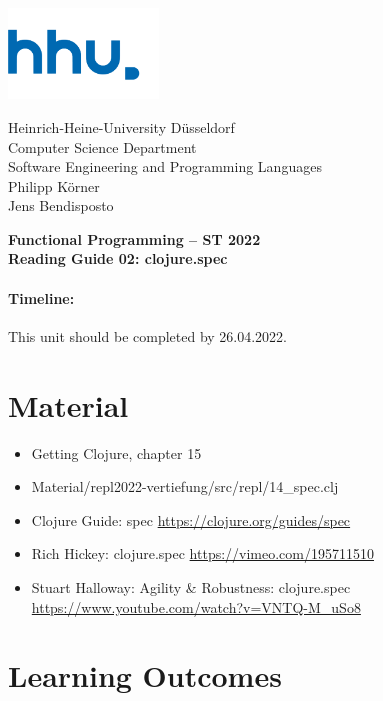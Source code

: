\documentclass[11pt,a4paper]{article}
\begin{document}
\begin{minipage}[b]{\textwidth}
	\parbox[t]{5cm}{%
		\includegraphics[width=4cm]{unilogo}
		\hfill
	}
	\parbox[b]{11cm}{%
		Heinrich-Heine-University D\"usseldorf\\
		Computer Science Department\\
		Software Engineering and Programming Languages\\
		Philipp K\"orner \\
        Jens Bendisposto
	}
\end{minipage}
\begin{center}
	\bf
	Functional Programming -- ST 2022\\
	Reading Guide 02: clojure.spec
\end{center}

\pagestyle{empty}

\paragraph{Timeline:} This unit should be completed by 26.04.2022.

\section{Material} 

\begin{itemize}
    \item Getting Clojure, chapter 15
	\item Material/repl2022-vertiefung/src/repl/14\_spec.clj
	\item Clojure Guide: spec \url{https://clojure.org/guides/spec}
	\item Rich Hickey: clojure.spec \url{https://vimeo.com/195711510}
	\item Stuart Halloway: Agility \& Robustness: clojure.spec \url{https://www.youtube.com/watch?v=VNTQ-M_uSo8}
\end{itemize}


\section{Learning Outcomes}
\end{document}
